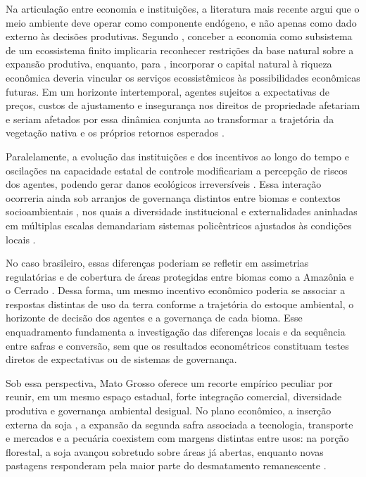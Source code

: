 Na articulação entre economia e instituições, a literatura mais recente argui que o meio ambiente deve operar como componente endógeno, e não apenas como dado externo às decisões produtivas. Segundo , conceber a economia como subsistema de um ecossistema finito implicaria reconhecer restrições da base natural sobre a expansão produtiva, enquanto, para , incorporar o capital natural à riqueza econômica deveria vincular os serviços ecossistêmicos às possibilidades econômicas futuras. Em um horizonte intertemporal, agentes sujeitos a expectativas de preços, custos de ajustamento e insegurança nos direitos de propriedade afetariam e seriam afetados por essa dinâmica conjunta ao transformar a trajetória da vegetação nativa e os próprios retornos esperados \cite{BalboniEtAl2023}. 

Paralelamente, a evolução das instituições e dos incentivos ao longo do tempo \cite{North1993} e oscilações na capacidade estatal de controle modificariam a percepção de riscos dos agentes, podendo gerar danos ecológicos irreversíveis \cite{FonsecaEtAl2022}. Essa interação ocorreria ainda sob arranjos de governança distintos entre biomas e contextos socioambientais \cite{PachecoMeyer2022}, nos quais a diversidade institucional e externalidades aninhadas em múltiplas escalas demandariam sistemas policêntricos ajustados às condições locais \cite{Ostrom2009,Ostrom2010,Ostrom2012,AnderssonEtAl2014}. 

No caso brasileiro, essas diferenças poderiam se refletir em assimetrias regulatórias e de cobertura de áreas protegidas entre biomas como a Amazônia e o Cerrado \cite{LuizSteinke2022}. Dessa forma, um mesmo incentivo econômico poderia se associar a respostas distintas de uso da terra conforme a trajetória do estoque ambiental, o horizonte de decisão dos agentes e a governança de cada bioma. Esse enquadramento fundamenta a investigação das diferenças locais e da sequência entre safras e conversão, sem que os resultados econométricos constituam testes diretos de expectativas ou de sistemas de governança.

Sob essa perspectiva, Mato Grosso oferece um recorte empírico peculiar por reunir, em um mesmo espaço estadual, forte integração comercial, diversidade produtiva e governança ambiental desigual. No plano econômico, a inserção externa da soja \cite{LathuilliereEtAl2014}, a expansão da segunda safra associada a tecnologia, transporte e mercados \cite{Spera2017,VanWeyEtAl2013} e a pecuária coexistem com margens distintas entre usos: na porção florestal, a soja avançou sobretudo sobre áreas já abertas, enquanto novas pastagens responderam pela maior parte do desmatamento remanescente \cite{MacedoEtAl2012}. 

